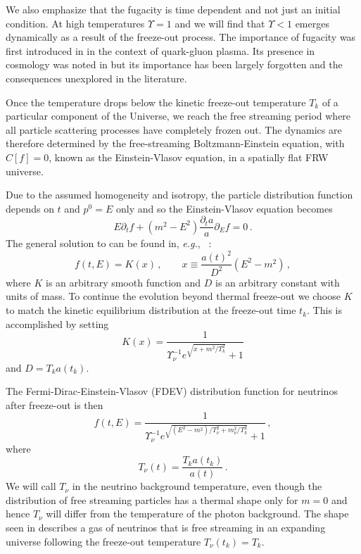 We also emphasize that the fugacity is time dependent and not just an initial condition. At high temperatures $\Upsilon=1$ and we will find that $\Upsilon<1$ emerges dynamically as a result of the freeze-out process. The importance of fugacity was first introduced in \cite{Rafelski:1982pu} in the context of quark-gluon plasma. Its presence in cosmology was noted in \cite{Bernstein:1985th,Dolgov:1992wf} but its importance has been largely forgotten and the consequences unexplored in the literature. 




Once the temperature drops below the kinetic freeze-out temperature $T_k$ of a particular component of the Universe, we reach the free streaming period where all particle scattering processes have completely frozen out. The dynamics are therefore determined by the free-streaming Boltzmann-Einstein equation,  with $C[f]=0$, known as the Einstein-Vlasov equation, in a spatially flat FRW universe.

Due to the assumed homogeneity and isotropy, the particle distribution function depends on $t$ and $p^0=E$ only and so the Einstein-Vlasov equation becomes
\begin{equation}\label{VEeqFLR}
E\partial_tf+(m^2-E^2)\frac{\partial_ta}{a}\partial_{E}f=0\,.
\end{equation}
The general solution to  can be found in, {\it e.g.\/}, ~\cite{Choquet-Bruhat:2009xil,Wong:2011ip}:
\begin{equation}
f(t,E)=K(x)\,,\qquad
x\equiv\frac{a(t)^2}{D^2}(E^2-m^2)\,,
\end{equation}
where $K$ is an arbitrary smooth function and $D$ is an arbitrary constant with units of mass. To continue the evolution beyond thermal freeze-out we choose $K$ to match the kinetic equilibrium distribution  at the freeze-out time $t_k$. This is accomplished by setting
\begin{equation}
K(x)=\frac{1}{\Upsilon_\nu^{-1}e^{\sqrt{x+m^2/T_k^2}}+ 1}
\end{equation}
and $D=T_k a(t_k)$. 

The Fermi-Dirac-Einstein-Vlasov (FDEV) distribution function for neutrinos after freeze-out is then
\begin{equation}\label{eq:NeutrinoDist}
f(t,E)=\frac{1}{\Upsilon_\nu^{-1}e^{\sqrt{(E^2-m^2)/T_\nu^2+m_\nu^2 /T_k^2}}+ 1}\,,
\end{equation}
where 
\begin{equation}\label{eq:TneutrinoDist}
T_\nu(t)=\frac{T_ka(t_k)}{a(t)}\,. 
\end{equation}
We will call $T_\nu$ in  the neutrino background temperature, even though the distribution of free streaming particles has a thermal shape only for $m=0$ and hence $T_{\nu}$ will differ from the temperature of the photon background. The shape seen in   describes a gas of neutrinos that is free streaming in an expanding universe following the freeze-out temperature $T_\nu(t_k)=T_k$. 

